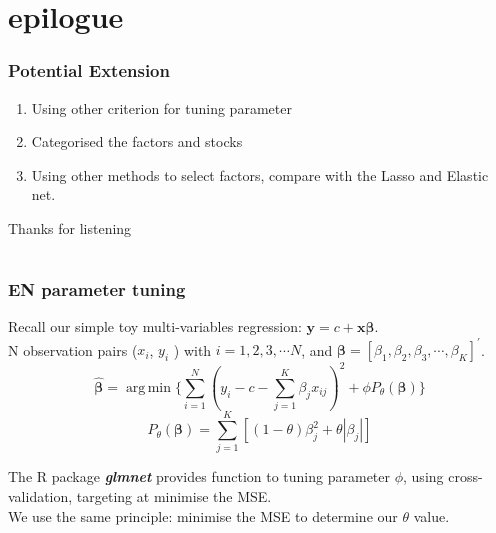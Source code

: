 \documentclass[12pt]{beamer}
\DeclareMathOperator*{\argmin}{arg\,min}
\begin{document}


\section*{epilogue}
\begin{frame}
\frametitle{Potential Extension}
\begin{enumerate}
\item Using other criterion for tuning parameter
\item Categorised the factors and stocks
\item Using other methods to select factors, compare with the Lasso and Elastic net.
\end{enumerate}
\end{frame}


\begin{frame}
	\centering	
\huge{ Thanks for listening\\}
\end{frame}

	\section*{}
\begin{frame}
\frametitle{EN parameter tuning}
Recall our simple toy multi-variables regression: $\boldsymbol{y} = c +  \boldsymbol{x}{\boldsymbol{\beta}}$. \\ N observation pairs ($x_i$, $y_i$ ) with $i =1,2,3, \cdots N$, and $\boldsymbol{\beta} = [\beta_1, \beta_2, \beta_3, \cdots, \beta_K]^{\prime}$.
\[  \hat{\boldsymbol{\beta}} = \argmin \{ \sum_{i = 1}^N(y_i - c - \sum_{j=1}^{K}\beta_{j}x_{ij})^2 + \phi P_\theta(\boldsymbol{\beta})          \}  \]
\[  P_{\theta}(\boldsymbol{\beta}) = \sum_{j = 1}^{K}[(1- \theta)\beta_j^2 + \theta |\beta_j| ]          \]

The R package \textbf{\textit{glmnet}} provides function to tuning parameter $\phi$, using cross-validation, targeting at minimise the MSE.\\
We use the same principle: minimise the MSE to determine our $\theta$ value.\\
\end{frame}
\end{document}
